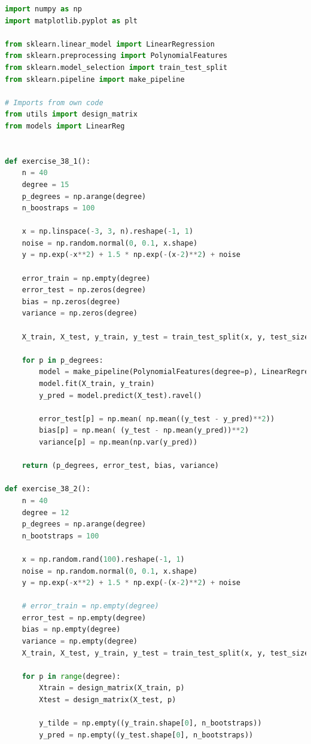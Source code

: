 \begin{lstlisting}[language=Python]
import numpy as np
import matplotlib.pyplot as plt

from sklearn.linear_model import LinearRegression
from sklearn.preprocessing import PolynomialFeatures
from sklearn.model_selection import train_test_split
from sklearn.pipeline import make_pipeline

# Imports from own code
from utils import design_matrix
from models import LinearReg


def exercise_38_1():
    n = 40
    degree = 15
    p_degrees = np.arange(degree)
    n_boostraps = 100

    x = np.linspace(-3, 3, n).reshape(-1, 1)
    noise = np.random.normal(0, 0.1, x.shape)
    y = np.exp(-x**2) + 1.5 * np.exp(-(x-2)**2) + noise 

    error_train = np.empty(degree)
    error_test = np.zeros(degree)
    bias = np.zeros(degree)
    variance = np.zeros(degree)

    X_train, X_test, y_train, y_test = train_test_split(x, y, test_size=0.2)

    for p in p_degrees:
        model = make_pipeline(PolynomialFeatures(degree=p), LinearRegression(fit_intercept=False))
        model.fit(X_train, y_train)
        y_pred = model.predict(X_test).ravel()

        error_test[p] = np.mean( np.mean((y_test - y_pred)**2))
        bias[p] = np.mean( (y_test - np.mean(y_pred))**2)
        variance[p] = np.mean(np.var(y_pred))

    return (p_degrees, error_test, bias, variance)

def exercise_38_2():
    n = 40
    degree = 12
    p_degrees = np.arange(degree)
    n_bootstraps = 100

    x = np.random.rand(100).reshape(-1, 1)
    noise = np.random.normal(0, 0.1, x.shape)
    y = np.exp(-x**2) + 1.5 * np.exp(-(x-2)**2) + noise 

    # error_train = np.empty(degree)
    error_test = np.empty(degree)
    bias = np.empty(degree)
    variance = np.empty(degree)
    X_train, X_test, y_train, y_test = train_test_split(x, y, test_size=0.2)

    for p in range(degree):
        Xtrain = design_matrix(X_train, p)
        Xtest = design_matrix(X_test, p)
        
        y_tilde = np.empty((y_train.shape[0], n_bootstraps))
        y_pred = np.empty((y_test.shape[0], n_bootstraps))


\end{lstlisting}
